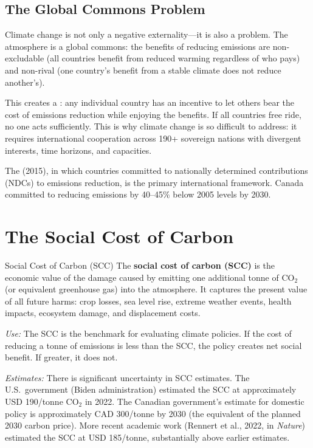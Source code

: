 \subsection{The Global Commons Problem}

Climate change is not only a negative externality---it is also a  problem. The atmosphere is a global commons: the benefits of reducing emissions are non-excludable (all countries benefit from reduced warming regardless of who pays) and non-rival (one country's benefit from a stable climate does not reduce another's).

This creates a : any individual country has an incentive to let others bear the cost of emissions reduction while enjoying the benefits. If all countries free ride, no one acts sufficiently. This is why climate change is so difficult to address: it requires international cooperation across 190+ sovereign nations with divergent interests, time horizons, and capacities.

The  (2015), in which countries committed to nationally determined contributions (NDCs) to emissions reduction, is the primary international framework. Canada committed to reducing emissions by 40--45\% below 2005 levels by 2030.

\section{The Social Cost of Carbon}

\begin{defbox}{Social Cost of Carbon (SCC)}
The \textbf{social cost of carbon (SCC)} is the economic value of the damage caused by emitting one additional tonne of CO$_2$ (or equivalent greenhouse gas) into the atmosphere. It captures the present value of all future harms: crop losses, sea level rise, extreme weather events, health impacts, ecosystem damage, and displacement costs.

\textit{Use:} The SCC is the benchmark for evaluating climate policies. If the cost of reducing a tonne of emissions is less than the SCC, the policy creates net social benefit. If greater, it does not.

\textit{Estimates:} There is significant uncertainty in SCC estimates. The U.S.\ government (Biden administration) estimated the SCC at approximately USD 190/tonne CO$_2$ in 2022. The Canadian government's estimate for domestic policy is approximately CAD 300/tonne by 2030 (the equivalent of the planned 2030 carbon price). More recent academic work (Rennert et al., 2022, in \textit{Nature}) estimated the SCC at USD 185/tonne, substantially above earlier estimates.
\end{defbox}

